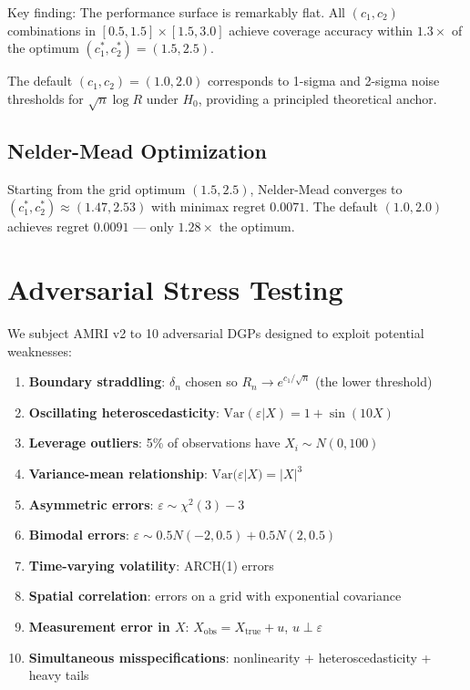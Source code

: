 \documentclass[12pt]{article}
\theoremstyle{definition}
\theoremstyle{remark}
\begin{document}
Key finding: The performance surface is remarkably flat. All $(c_1, c_2)$
combinations in $[0.5, 1.5] \times [1.5, 3.0]$ achieve coverage accuracy
within $1.3\times$ of the optimum $(c_1^*, c_2^*) = (1.5, 2.5)$.

The default $(c_1, c_2) = (1.0, 2.0)$ corresponds to 1-sigma and 2-sigma
noise thresholds for $\sqrt{n} \log R$ under $H_0$, providing a principled
theoretical anchor.

\subsection{Nelder-Mead Optimization}

Starting from the grid optimum $(1.5, 2.5)$, Nelder-Mead converges to
$(c_1^*, c_2^*) \approx (1.47, 2.53)$ with minimax regret $0.0071$.
The default $(1.0, 2.0)$ achieves regret $0.0091$ --- only $1.28\times$ the optimum.


\section{Adversarial Stress Testing}
\label{sec:supp_adversarial}

We subject AMRI v2 to 10 adversarial DGPs designed to exploit potential weaknesses:

\begin{enumerate}
\item \textbf{Boundary straddling}: $\delta_n$ chosen so $R_n \to e^{c_1/\sqrt{n}}$ (the lower threshold)
\item \textbf{Oscillating heteroscedasticity}: $\text{Var}(\varepsilon|X) = 1 + \sin(10X)$
\item \textbf{Leverage outliers}: 5\% of observations have $X_i \sim N(0, 100)$
\item \textbf{Variance-mean relationship}: $\text{Var}(\varepsilon|X) = |X|^3$
\item \textbf{Asymmetric errors}: $\varepsilon \sim \chi^2(3) - 3$
\item \textbf{Bimodal errors}: $\varepsilon \sim 0.5 N(-2, 0.5) + 0.5 N(2, 0.5)$
\item \textbf{Time-varying volatility}: ARCH(1) errors
\item \textbf{Spatial correlation}: errors on a grid with exponential covariance
\item \textbf{Measurement error in $X$}: $X_\text{obs} = X_\text{true} + u$, $u \perp \varepsilon$
\item \textbf{Simultaneous misspecifications}: nonlinearity + heteroscedasticity + heavy tails
\end{enumerate}
\end{document}
